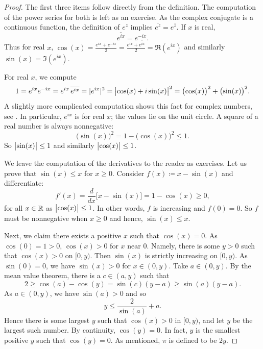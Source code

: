 \begin{proof}
The first three items follow directly from the definition.
The computation of the power series for both is left as an exercise.
As the complex conjugate is a continuous function, the definition
of $e^z$ implies
$\overline{e^z} = e^{\bar{z}}$.  If
$x$ is real,
\begin{equation*}
\overline{e^{ix}} = e^{-ix} .
\end{equation*}
Thus for real $x$,
$\cos(x) =
\frac{e^{ix}+e^{-ix}}{2} =
\frac{e^{ix}+\overline{e^{ix}}}{2} =
\Re (e^{ix})$
and similarly $\sin(x) = \Im (e^{ix})$.

For real $x$, we compute
\begin{equation*}
1 =  e^{ix} e^{-ix}
= e^{ix} \, \overline{e^{ix}}
= \lvert {e^{ix}} \rvert^2
= \bigl\lvert {\cos(x) + i \sin(x)} \bigr\rvert^2
= {\bigl( \cos(x) \bigr)}^2 + {\bigl( \sin(x) \bigr)}^2 .
\end{equation*}
A slightly more complicated computation shows this fact for
complex numbers, see .
In particular, $e^{ix}$ is \emph{} for real $x$;
the values lie on the unit circle.
A square of a real number is always nonnegative:
\begin{equation*}
{\bigl(\sin(x)\bigr)}^2 = 1-{\bigl(\cos(x)\bigr)}^2 \leq 1 .
\end{equation*}
So $\bigl\lvert {\sin(x)} \bigr\rvert \leq 1$ and similarly 
$\bigl\lvert {\cos(x)} \bigr\rvert \leq 1$.

We leave the computation of the derivatives to the reader as exercises.
Let us prove that $\sin(x) \leq x$ for $x \geq 0$.
Consider
$f(x) \coloneqq x-\sin(x)$ and differentiate:
\begin{equation*}
f'(x) = \frac{d}{dx} \bigl[ x - \sin(x) \bigr]
=
1 -\cos(x) \geq 0 ,
\end{equation*}
for all $x \in {\mathbb{R}}$ as $\bigl\lvert {\cos(x)} \bigr\rvert \leq 1$.
In other words, $f$ is increasing and $f(0) = 0$.
So $f$ must be nonnegative when $x \geq 0$ and hence, $\sin(x) \leq x$.

Next, we claim there exists a positive $x$ such that $\cos(x) = 0$.
As $\cos(0) = 1 > 0$, $\cos(x) > 0$
for $x$ near $0$.  Namely,
there is some
$y > 0$ such that $\cos(x) > 0$ on $[0,y)$.
Then $\sin(x)$ is strictly
increasing on $[0,y)$.  As $\sin(0) = 0$, we have
$\sin(x) > 0$ for $x \in (0,y)$.  Take $a \in (0,y)$.  By
the mean value theorem, there is a $c \in (a,y)$ such that
\begin{equation*}
2 \geq \cos(a)-\cos(y) = \sin(c)(y-a) \geq \sin(a)(y-a) .
\end{equation*}
As $a \in (0,y)$, we have $\sin(a) > 0$ and so
\begin{equation*}
y \leq \frac{2}{\sin(a)} + a .
\end{equation*}
Hence there is some largest $y$ such that $\cos(x) > 0$ in $[0,y)$,
and let $y$ be the largest such number.
By continuity, $\cos(y) = 0$.
In fact, $y$ is the
smallest positive $y$ such that $\cos(y) = 0$.  As mentioned,
$\pi$ is defined to be $2y$.


\end{proof}
